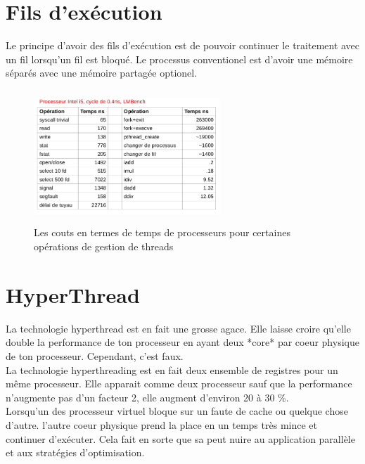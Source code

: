 \documentclass[oneside]{book}
\begin{document}
\section{Fils d'exécution}
Le principe d'avoir des fils d'exécution est de pouvoir continuer le traitement avec un fil lorsqu'un fil est bloqué. Le processus conventionel est d'avoir une mémoire séparés avec une mémoire partagée optionel.
\begin{figure}[!ht]
\centering
\includegraphics[width = 7cm, height = 5cm, keepaspectratio]{i5costs.png}
\caption{Les couts en termes de temps de processeurs pour certaines opérations de gestion de threads}
\label{fig:i5costs}
\end{figure}
\section{HyperThread}
La technologie hyperthread est en fait une grosse agace. Elle laisse croire qu'elle double la performance de ton processeur en ayant deux *core* par coeur physique de ton processeur. Cependant, c'est faux. \\

La technologie hyperthreading est en fait deux ensemble de registres pour un même processeur. Elle apparait comme deux processeur sauf que la performance n'augmente pas d'un facteur 2, elle augment d'environ 20 à 30 \%. \\

Lorsqu'un des processeur virtuel bloque sur un faute de cache ou quelque chose d'autre. l'autre coeur physique prend la place en un temps très mince et continuer d'exécuter. Cela fait en sorte que sa peut nuire au application parallèle et aux stratégies d'optimisation.
\end{document}
